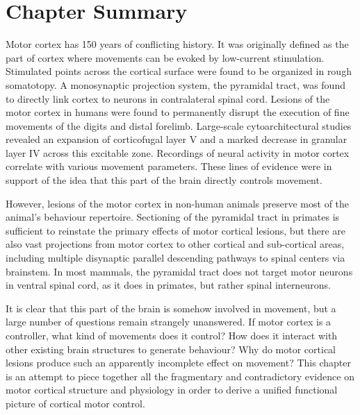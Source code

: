 				
\section{Chapter Summary}

Motor cortex has 150 years of conflicting history. It was originally defined as the part of cortex where movements can be evoked by low-current stimulation. Stimulated points across the cortical surface were found to be organized in rough somatotopy. A monosynaptic projection system, the pyramidal tract, was found to directly link cortex to neurons in contralateral spinal cord. Lesions of the motor cortex in humans were found to permanently disrupt the execution of fine movements of the digits and distal forelimb. Large-scale cytoarchitectural studies revealed an expansion of corticofugal layer V and a marked decrease in granular layer IV across this excitable zone. Recordings of neural activity in motor cortex correlate with various movement parameters. These lines of evidence were in support of the idea that this part of the brain directly controls movement.

However, lesions of the motor cortex in non-human animals preserve most of the animal's behaviour repertoire. Sectioning of the pyramidal tract in primates is sufficient to reinstate the primary effects of motor cortical lesions, but there are also vast projections from motor cortex to other cortical and sub-cortical areas, including multiple disynaptic parallel descending pathways to spinal centers via brainstem. In most mammals, the pyramidal tract does not target motor neurons in ventral spinal cord, as it does in primates, but rather spinal interneurons.

It is clear that this part of the brain is somehow involved in movement, but a large number of questions remain strangely unanswered. If motor cortex is a controller, what kind of movements does it control? How does it interact with other existing brain structures to generate behaviour? Why do motor cortical lesions produce such an apparently incomplete effect on movement? This chapter is an attempt to piece together all the fragmentary and contradictory evidence on motor cortical structure and physiology in order to derive a unified functional picture of cortical motor control.

\pagebreak


